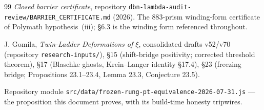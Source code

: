 \documentclass[11pt]{article}
\theoremstyle{definition}
\theoremstyle{remark}
\begin{document}
\begin{thebibliography}{99}
 \emph{Closed barrier certificate}, repository
\texttt{dbn-lambda-audit-review/BARRIER\_CERTIFICATE.md} (2026). The
883-prism winding-form certificate of Polymath hypothesis~(iii); \S6.3 is
the winding form referenced throughout.

 J. Gomila, \emph{Twin-Ladder Deformations of $\xi$},
consolidated drafts v52/v70 (repository \texttt{research-inputs/}), \S15
(shift-bridge positivity; corrected threshold theorem), \S17 (Blaschke
ghosts, Krein--Langer identity \S17.4), \S23 (freezing bridge; Propositions
23.1--23.4, Lemma 23.3, Conjecture 23.5).

 Repository module
\texttt{src/data/frozen-rung-pt-equivalence-2026-07-31.js} --- the
proposition this document proves, with its build-time honesty tripwires.

\end{thebibliography}
\end{document}
